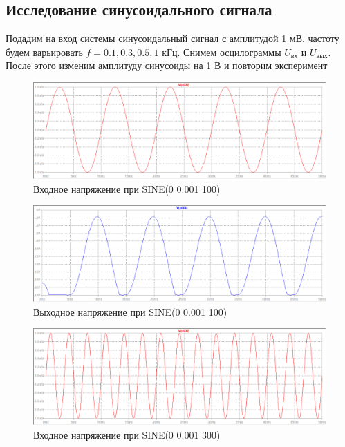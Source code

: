 \documentclass[a4paper, 12pt]{article}
\begin{document}
    \subsection{Исследование синусоидального сигнала}
    Подадим на вход системы синусоидальный сигнал с амплитудой 1 мВ,
    частоту будем варьировать $f=0.1,0.3,0.5,1$ кГц. Снимем осцилограммы
    $U_\text{вх}$ и $U_\text{вых}$. После этого изменим амплитуду синусоиды на 1 В и повторим эксперимент
    \begin{figure}[H]
        \centering
        \includegraphics[scale=0.46]{3task_sine_in_1mV_100f.png}
        \captionsetup{skip=0pt}
        \caption{Входное напряжение при SINE(0 0.001 100)}
        \label{fig:3task_sine_in_1mV_100f}
    \end{figure}
    \begin{figure}[H]
        \centering
        \includegraphics[scale=0.46]{3task_sine_out_1mV_100f.png}
        \captionsetup{skip=0pt}
        \caption{Выходное напряжение при SINE(0 0.001 100)}
        \label{fig:3task_sine_out_1mV_100f}
    \end{figure}
    \begin{figure}[H]
        \centering
        \includegraphics[scale=0.46]{3task_sine_in_1mV_300f.png}
        \captionsetup{skip=0pt}
        \caption{Входное напряжение при SINE(0 0.001 300)}
        \label{fig:3task_sine_in_1mV_300f}
    \end{figure}
\end{document}
